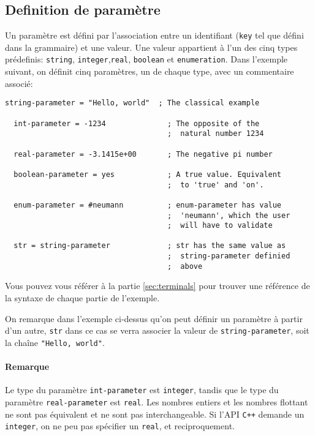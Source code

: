 \subsection{Definition de param\`etre}
Un param\`etre est d\'efini par l'association entre un identifiant
(\texttt{key} tel que d\'efini dans la grammaire) et une valeur. Une
valeur appartient \`a l'un des cinq types pr\'edefinis:
\texttt{string}, \texttt{integer},\texttt{real}, \texttt{boolean} et
\texttt{enumeration}. Dans l'exemple suivant, on d\'efinit cinq
param\`etres, un de chaque type, avec un commentaire associ\'e:
\begin{lstlisting}[language={},frame=single,basicstyle=\ttfamily]
  string-parameter = "Hello, world"  ; The classical example

  int-parameter = -1234              ; The opposite of the
                                     ;  natural number 1234

  real-parameter = -3.1415e+00       ; The negative pi number

  boolean-parameter = yes            ; A true value. Equivalent
                                     ;  to 'true' and 'on'.

  enum-parameter = #neumann          ; enum-parameter has value
                                     ;  'neumann', which the user
                                     ;  will have to validate

  str = string-parameter             ; str has the same value as
                                     ;  string-parameter definied
                                     ;  above
\end{lstlisting}
Vous pouvez vous r\'ef\'erer \`a la partie \ref{sec:terminals} pour
trouver une r\'ef\'erence de la syntaxe de chaque partie de l'exemple.

On remarque dans l'exemple ci-dessus qu'on peut d\'efinir un
param\`etre \`a partir d'un autre, \texttt{str} dans ce cas se verra
associer la valeur de \texttt{string-parameter}, soit la cha\^ine
\texttt{"Hello, world"}.

\paragraph{Remarque} Le type du param\`etre \texttt{int-parameter} est
\texttt{integer}, tandis que le type du param\`etre
\texttt{real-parameter} est \texttt{real}. Les nombres entiers et les
nombres flottant ne sont pas \'equivalent et ne sont pas
interchangeable. Si l'API \texttt{C++} demande un \texttt{integer}, on
ne peu pas sp\'ecifier un \texttt{real}, et reciproquement.

